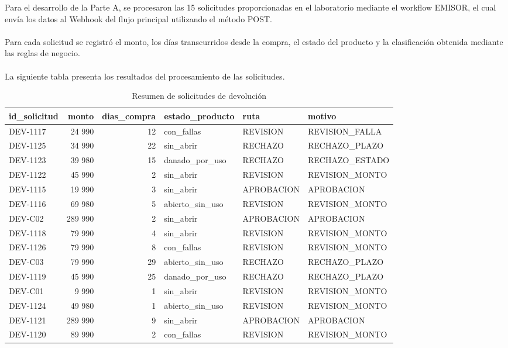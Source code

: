 \documentclass[12pt,a4paper]{article}
\begin{document}
\noindent Para el desarrollo de la Parte A, se procesaron las 15 solicitudes proporcionadas en el laboratorio mediante el workflow EMISOR, el cual envía los datos al Webhook del flujo principal utilizando el método POST.
\\\\
\noindent Para cada solicitud se registró el monto, los días transcurridos desde la compra, el estado del producto y la clasificación obtenida mediante las reglas de negocio.
\\\\
\noindent La siguiente tabla presenta los resultados
del procesamiento de las solicitudes.

\begin{table}[H]
\centering
\label{tab:solicitudes}
\vspace{0.3cm}
\footnotesize
\begin{tabularx}{\textwidth}{l r r X X X}
\toprule
\textbf{id\_solicitud} & \textbf{monto} & \textbf{dias\_compra} & \textbf{estado\_producto} & \textbf{ruta} & \textbf{motivo} \\
\midrule
DEV-1117 & 24 990 & 12 & con\_fallas & REVISION & REVISION\_FALLA \\
DEV-1125 & 34 990 & 22 & sin\_abrir & RECHAZO & RECHAZO\_PLAZO \\
DEV-1123 & 39 980 & 15 & danado\_por\_uso & RECHAZO & RECHAZO\_ESTADO \\
DEV-1122 & 45 990 & 2 & sin\_abrir & REVISION & REVISION\_MONTO \\
DEV-1115 & 19 990 & 3 & sin\_abrir & APROBACION & APROBACION \\
DEV-1116 & 69 980 & 5 & abierto\_sin\_uso & REVISION & REVISION\_MONTO \\
DEV-C02 & 289 990 & 2 & sin\_abrir & APROBACION & APROBACION \\
DEV-1118 & 79 990 & 4 & sin\_abrir & REVISION & REVISION\_MONTO \\
DEV-1126 & 79 990 & 8 & con\_fallas & REVISION & REVISION\_MONTO \\
DEV-C03 & 79 990 & 29 & abierto\_sin\_uso & RECHAZO & RECHAZO\_PLAZO \\
DEV-1119 & 45 990 & 25 & danado\_por\_uso & RECHAZO & RECHAZO\_PLAZO \\
DEV-C01 & 9 990 & 1 & sin\_abrir & REVISION & REVISION\_MONTO \\
DEV-1124 & 49 980 & 1 & abierto\_sin\_uso & REVISION & REVISION\_MONTO \\
DEV-1121 & 289 990 & 9 & sin\_abrir & APROBACION & APROBACION \\
DEV-1120 & 89 990 & 2 & con\_fallas & REVISION & REVISION\_MONTO \\
\bottomrule
\end{tabularx}
\caption{Resumen de solicitudes de devolución}
\end{table}
\end{document}
